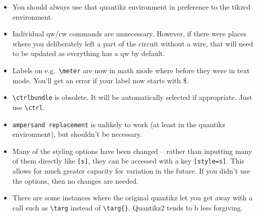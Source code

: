 \documentclass[aps,pra,10pt,nofootinbib]{revtex4-2}
\begin{document}
\begin{itemize}
  \item You should always use that quantikz environment in preference to the tikzcd environment.
\item Individual qw/cw commands are unnecessary. However, if there were places where you deliberately left a part of the circuit without a wire, that will need to be updated as everything has a qw by default.
\item Labels on e.g.\ \verb!\meter! are now in math mode where before they were in text mode. You'll get an error if your label now starts with \$.
\item \verb!\ctrlbundle! is obsolete. It will be automatically selected if appropriate. Just use \verb!\ctrl!.
\item \texttt{ampersand replacement} is unlikely to work (at least in the quantikz environment), but shouldn't be necessary.
\item Many of the styling options have been changed -- rather than inputting many of them directly like \verb![s]!, they can be accessed with a key \verb![style=s]!. This allows for much greater capacity for variation in the future. If you didn't use the options, then no changes are needed.
\item There are some instances where the original quantikz let you get away with a call such as \verb!\targ! instead of \verb!\targ{}!. Quantikz2 tends to b less forgiving.
  \end{itemize}


\end{document}

